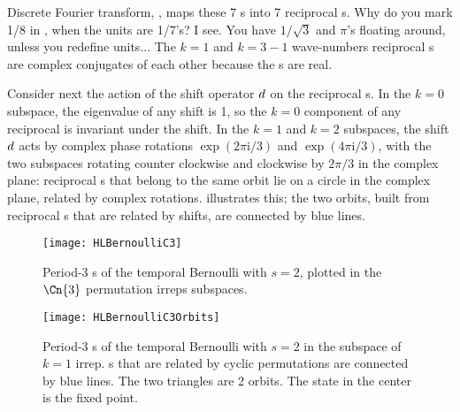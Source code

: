 Discrete Fourier transform, , maps
these 7 {\lattstate}s into 7 reciprocal {\lattstate}s.
         {
Why do you mark 1/8 in
, when the
units are 1/7's? I see. You have $1/\sqrt{3}$ and $\pi$'s floating
around, unless you redefine units...
    }
The $k=1$ and $k=3-1$ wave-numbers reciprocal {\lattstate}s are complex
conjugates of each other because the {\lattstate}s are real.

Consider next the action of the shift operator $d$ on the reciprocal
{\lattstate}s.
In the $k=0$ subspace, the eigenvalue of any shift is 1, so the $k=0$
component of any reciprocal {\lattstate} is invariant under the shift.
In the $k=1$ and $k=2$ subspaces, the shift $d$ acts by complex
phase rotations $\exp(2 \pi \mathrm{i}/3)$ and $\exp(4 \pi
\mathrm{i}/3)$, with the two subspaces rotating counter clockwise and
clockwise by $2\pi/3$ in the complex plane: reciprocal {\lattstate}s that
belong to the same orbit lie on a circle in the complex plane, related by
complex rotations.
 illustrates this; the two
orbits, built from reciprocal {\lattstate}s that are related by shifts,
are connected by blue lines.


\begin{figure}
  \centering
\texttt{[image: HLBernoulliC3]}
  \caption{\label{fig:HLBernoulliC3}
Period-3 {\lattstate}s of the {temporal Bernoulli} with $s=2$, plotted in the $\Cn{3}$
permutation irreps subspaces.
}
\end{figure}

\begin{figure}\begin{center}
            \begin{minipage}[c]{0.45\textwidth}\begin{center}
\texttt{[image: HLBernoulliC3Orbits]}\\
            \end{center}\end{minipage}
\end{center}
  \caption{\label{fig:HLBernoulliC3InvariantOrbits}
Period-3 {\lattstate}s of the {temporal Bernoulli} with $s=2$ in the subspace of
$k=1$ irrep.
{\Lattstate}s that are related by cyclic permutations are connected by blue lines.
The two triangles are 2  orbits. The state in
the center is the fixed point.
}
\end{figure}

